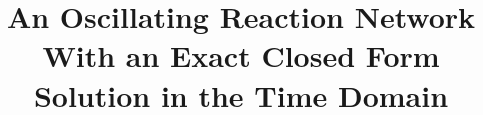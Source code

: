 \documentclass{bmcart}
\begin{document}
\begin{frontmatter}

\begin{fmbox}



\title{An Oscillating Reaction Network With an Exact Closed Form Solution in the Time Domain}


\author[
  addressref={aff1},                   %
  corref={aff1},
  email={jlheller@uw.edu}
]{ }


\address[id=aff1]{%
  ,             %
  ,          %
  ,                              %
}


\end{fmbox}
\end{frontmatter}
\end{document}
